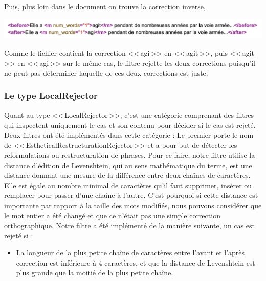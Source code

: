 \documentclass[11pt]{article}
\begin{document}
Puis, plus loin dans le document on trouve la correction inverse,

\begin{center}
\includegraphics[width=14cm]{exemple11.png} %
\end{center}

Comme le fichier contient la correction <<\,agi\,>> en <<\,agit\,>>, puis <<\,agit\,>> en <<\,agi\,>> sur le m\^{e}me cas, le filtre rejette les deux corrections puisqu'il ne peut pas d\'{e}terminer laquelle de ces deux corrections est juste.

\subsubsection{Le type LocalRejector}
Quant au type <<\,LocalRejector\,>>, c'est une cat\'{e}gorie comprenant des filtres qui inspectent uniquement le cas et son contenu pour d\'{e}cider si le cas est rejet\'{e}. Deux filtres ont \'{e}t\'{e} impl\'{e}ment\'{e}s dans cette cat\'{e}gorie :
\newline
Le premier porte le nom de <<\,EstheticalRestructurationRejector\,>> et a pour but de d\'{e}tecter les reformulations ou restructuration de phrases. Pour ce faire, notre filtre utilise la distance d'\'{e}dition de Levenshtein, qui au sens math\'{e}matique du terme, est une distance donnant une mesure de la diff\'{e}rence entre deux cha\^{i}nes de caract\`{e}res. Elle est \'{e}gale au nombre minimal de caract\`{e}res qu'il faut supprimer, ins\'{e}rer ou remplacer pour passer d'une cha\^{i}ne \`{a} l'autre. C'est pourquoi si cette distance est importante par rapport \`{a} la taille des mots modifi\'{e}s, nous pouvons consid\'{e}rer que le mot entier a \'{e}t\'{e} chang\'{e} et que ce n'\'{e}tait pas une simple correction orthographique. 
\newline
Notre filtre a \'{e}t\'{e} impl\'{e}ment\'{e} de la mani\`{e}re suivante, un cas est rejet\'{e} si :
\begin{itemize}
\item La longueur de la plus petite cha\^{i}ne de caract\`{e}res entre l'avant et l'apr\`{e}s correction est inf\'{e}rieure \`{a} 4 caract\`{e}res, et que la distance de Levenshtein est plus grande que la moiti\'{e} de la plus petite cha\^{i}ne.
\end{itemize}
\end{document}
